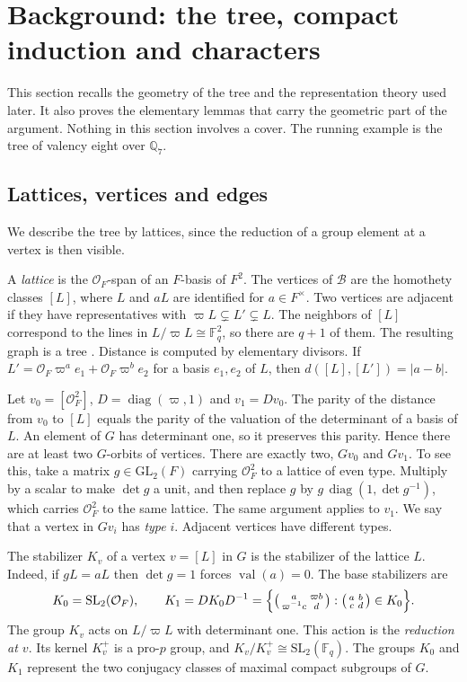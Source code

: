 \documentclass[12pt,letterpaper]{article}
\numberwithin{equation}{section}
\theoremstyle{definition}
\theoremstyle{remark}
\newcommand{\OO}{\mathcal O_F}
\newcommand{\kk}{\mathbb F_q}
\newcommand{\val}{\operatorname{val}}
\newcommand{\diag}{\operatorname{diag}}
\newcommand{\BT}{\mathscr B}
\newcommand{\sm}[4]{\left(\begin{smallmatrix}#1&#2\\#3&#4\end{smallmatrix}\right)}
\begin{document}
\section{Background: the tree, compact induction and characters}\label{sec:background}
This section recalls the geometry of the tree and the representation theory used later. It also proves the elementary lemmas that carry the geometric part of the argument. Nothing in this section involves a cover. The running example is the tree of valency eight over $\mathbb Q_7$.

\subsection*{Lattices, vertices and edges}
We describe the tree by lattices, since the reduction of a group element at a vertex is then visible.

A \emph{lattice} is the $\OO$-span of an $F$-basis of $F^2$. The vertices of $\BT$ are the homothety classes $[L]$, where $L$ and $aL$ are identified for $a\in F^\times$. Two vertices are adjacent if they have representatives with $\varpi L\subsetneq L'\subsetneq L$. The neighbors of $[L]$ correspond to the lines in $L/\varpi L\cong\kk^2$, so there are $q+1$ of them. The resulting graph is a tree \cite{Ca14}. Distance is computed by elementary divisors. If $L'=\OO\varpi^a e_1+\OO\varpi^b e_2$ for a basis $e_1,e_2$ of $L$, then $d([L],[L'])=|a-b|$.

Let $v_0=[\OO^2]$, $D=\diag(\varpi,1)$ and $v_1=Dv_0$. The parity of the distance from $v_0$ to $[L]$ equals the parity of the valuation of the determinant of a basis of $L$. An element of $G$ has determinant one, so it preserves this parity. Hence there are at least two $G$-orbits of vertices. There are exactly two, $Gv_0$ and $Gv_1$. To see this, take a matrix $g\in\mathrm{GL}_2(F)$ carrying $\OO^2$ to a lattice of even type. Multiply by a scalar to make $\det g$ a unit, and then replace $g$ by $g\,\diag(1,\det g^{-1})$, which carries $\OO^2$ to the same lattice. The same argument applies to $v_1$. We say that a vertex in $Gv_i$ has \emph{type} $i$. Adjacent vertices have different types.

The stabilizer $K_v$ of a vertex $v=[L]$ in $G$ is the stabilizer of the lattice $L$. Indeed, if $gL=aL$ then $\det g=1$ forces $\val(a)=0$. The base stabilizers are
\begin{equation}\label{eq:ki}
 K_0=\mathrm{SL}_2(\OO),\qquad K_1=DK_0D^{-1}
 =\Bigl\{\sm{a}{\varpi b}{\varpi^{-1}c}{d}:\sm abcd\in K_0\Bigr\}.
\end{equation}
The group $K_v$ acts on $L/\varpi L$ with determinant one. This action is the \emph{reduction at $v$}. Its kernel $K_v^+$ is a pro-$p$ group, and $K_v/K_v^+\cong\mathrm{SL}_2(\kk)$. The groups $K_0$ and $K_1$ represent the two conjugacy classes of maximal compact subgroups of $G$.
\end{document}
